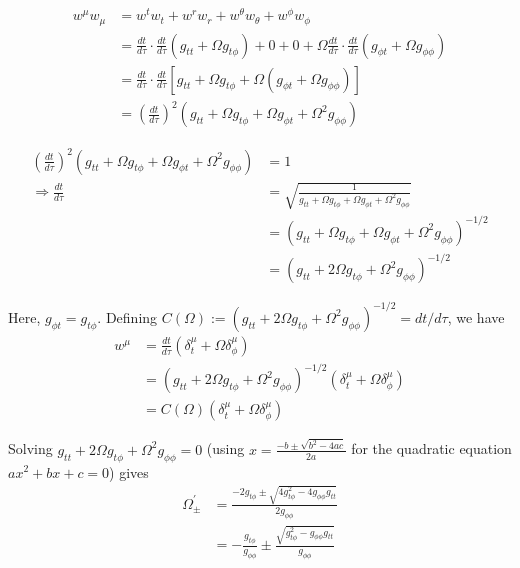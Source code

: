 \documentclass[english]{article}
\begin{document}
\begin{align*}
w^{\mu}w_{\mu} & =w^{t}w_{t}+w^{r}w_{r}+w^{\theta}w_{\theta}+w^{\phi}w_{\phi}\\
 & =\frac{dt}{d\tau}\cdot\frac{dt}{d\tau}\left(g_{tt}+\Omega g_{t\phi}\right)+0+0+\Omega\frac{dt}{d\tau}\cdot\frac{dt}{d\tau}\left(g_{\phi t}+\Omega g_{\phi\phi}\right)\\
 & =\frac{dt}{d\tau}\cdot\frac{dt}{d\tau}\left[g_{tt}+\Omega g_{t\phi}+\Omega\left(g_{\phi t}+\Omega g_{\phi\phi}\right)\right]\\
 & =\left(\frac{dt}{d\tau}\right)^{2}\left(g_{tt}+\Omega g_{t\phi}+\Omega g_{\phi t}+\Omega^{2}g_{\phi\phi}\right)
\end{align*}

\begin{align*}
\left(\frac{dt}{d\tau}\right)^{2}\left(g_{tt}+\Omega g_{t\phi}+\Omega g_{\phi t}+\Omega^{2}g_{\phi\phi}\right) & =1\\
\Rightarrow\frac{dt}{d\tau} & =\sqrt{\frac{1}{g_{tt}+\Omega g_{t\phi}+\Omega g_{\phi t}+\Omega^{2}g_{\phi\phi}}}\\
 & =\left(g_{tt}+\Omega g_{t\phi}+\Omega g_{\phi t}+\Omega^{2}g_{\phi\phi}\right)^{-1/2}\\
 & =\left(g_{tt}+2\Omega g_{t\phi}+\Omega^{2}g_{\phi\phi}\right)^{-1/2}
\end{align*}

Here, $g_{\phi t}=g_{t\phi}$. Defining $C\left(\Omega\right):=\left(g_{tt}+2\Omega g_{t\phi}+\Omega^{2}g_{\phi\phi}\right)^{-1/2}=dt/d\tau$,
we have 
\begin{align*}
w^{\mu} & =\frac{dt}{d\tau}\left(\delta^{\mu}_{\!t}+\Omega\delta^{\mu}_{\!\phi}\right)\\
 & =\left(g_{tt}+2\Omega g_{t\phi}+\Omega^{2}g_{\phi\phi}\right)^{-1/2}\left(\delta^{\mu}_{\!t}+\Omega\delta^{\mu}_{\!\phi}\right)\\
 & =C\left(\Omega\right)\left(\delta^{\mu}_{\!t}+\Omega\delta^{\mu}_{\!\phi}\right)
\end{align*}

Solving $g_{tt}+2\Omega g_{t\phi}+\Omega^{2}g_{\phi\phi}=0$ (using
$x=\frac{-b\pm\sqrt{b^{2}-4ac}}{2a}$ for the quadratic equation $ax^{2}+bx+c=0$)
gives 
\begin{align*}
\Omega^{'}_{\pm} & =\frac{-2g_{t\phi}\pm\sqrt{4g^{2}_{t\phi}-4g_{\phi\phi}g_{tt}}}{2g_{\phi\phi}}\\
 & =-\frac{g_{t\phi}}{g_{\phi\phi}}\pm\frac{\sqrt{g^{2}_{t\phi}-g_{\phi\phi}g_{tt}}}{g_{\phi\phi}}
\end{align*}
\end{document}
